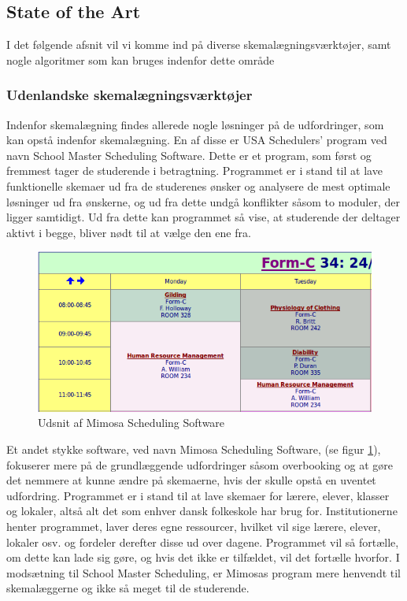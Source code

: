 \subsection{State of the Art}
I det følgende afsnit vil vi komme ind på diverse skemalægningsværktøjer, samt nogle algoritmer som kan bruges indenfor dette område
\label{sota}

\subsubsection{Udenlandske skemalægningsværktøjer}
Indenfor skemalægning findes allerede nogle løsninger på de udfordringer, som kan opstå indenfor skemalægning. En af disse er USA Schedulers' program ved navn School Master Scheduling Software\cite{USAS}. Dette er et program, som først og fremmest tager de studerende i betragtning. Programmet er i stand til at lave funktionelle skemaer ud fra de studerenes ønsker og analysere de mest optimale løsninger ud fra ønskerne, og ud fra dette undgå konflikter såsom to moduler, der ligger samtidigt. Ud fra dette kan programmet så vise, at studerende der deltager aktivt i begge, bliver nødt til at vælge den ene fra.
\begin{figure}[h!]
	\centering
	\includegraphics[width=1.0\textwidth]{../Billeder/MimosaSoftware.png}
	\caption{Udsnit af Mimosa Scheduling Software\cite{mimosaPicture}}
	\label{fig:Mimosa}
\end{figure}
\FloatBarrier
Et andet stykke software, ved navn Mimosa Scheduling Software\cite{Mimosa}, (se figur \ref{fig:Mimosa}), fokuserer mere på de grundlæggende udfordringer såsom overbooking og at gøre det nemmere at kunne ændre på skemaerne, hvis der skulle opstå en uventet udfordring. Programmet er i stand til at lave skemaer for lærere, elever, klasser og lokaler, altså alt det som enhver dansk folkeskole har brug for. Institutionerne henter programmet, laver deres egne ressourcer, hvilket vil sige lærere, elever, lokaler osv. og fordeler derefter disse ud over dagene. Programmet vil så fortælle, om dette kan lade sig gøre, og hvis det ikke er tilfældet, vil det fortælle hvorfor\cite{MimosaTutorial}. I modsætning til School Master Scheduling, er Mimosas program mere henvendt til skemalæggerne og ikke så meget til de studerende. 

